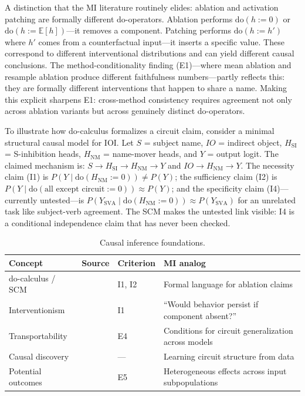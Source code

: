 \documentclass{article}
\begin{document}
A distinction that the MI literature routinely elides: ablation and activation patching are formally different do-operators. Ablation performs $\mathrm{do}(h := 0)$ or $\mathrm{do}(h := \mathbb{E}[h])$---it removes a component. Patching performs $\mathrm{do}(h := h')$ where $h'$ comes from a counterfactual input---it inserts a specific value. These correspond to different interventional distributions and can yield different causal conclusions. The method-conditionality finding (E1)---where mean ablation and resample ablation produce different faithfulness numbers---partly reflects this: they are formally different interventions that happen to share a name. Making this explicit sharpens E1: cross-method consistency requires agreement not only across ablation variants but across genuinely distinct do-operators.

To illustrate how do-calculus formalizes a circuit claim, consider a minimal structural causal model for IOI. Let $S$ = subject name, $IO$ = indirect object, $H_{\text{SI}}$ = S-inhibition heads, $H_{\text{NM}}$ = name-mover heads, and $Y$ = output logit. The claimed mechanism is: $S \to H_{\text{SI}} \to H_{\text{NM}} \to Y$ and $IO \to H_{\text{NM}} \to Y$. The necessity claim (I1) is $P(Y \mid \mathrm{do}(H_{\text{NM}} := 0)) \neq P(Y)$; the sufficiency claim (I2) is $P(Y \mid \mathrm{do}(\text{all except circuit} := 0)) \approx P(Y)$; and the specificity claim (I4)---currently untested---is $P(Y_{\text{SVA}} \mid \mathrm{do}(H_{\text{NM}} := 0)) \approx P(Y_{\text{SVA}})$ for an unrelated task like subject-verb agreement. The SCM makes the untested link visible: I4 is a conditional independence claim that has never been checked.

\begin{table}[H]
\centering\small
\caption{Causal inference foundations.}
\renewcommand{\arraystretch}{1.12}
\begin{tabular}{@{}l>{\raggedright\arraybackslash}p{2.5cm}l>{\raggedright\arraybackslash}p{4.2cm}@{}}
\toprule
\textbf{Concept} & \textbf{Source} & \textbf{Criterion} & \textbf{MI analog} \\
\midrule
do-calculus / SCM & \citet{pearl2009causality} & I1, I2 & Formal language for ablation claims \\
\midrule
Interventionism & \citet{woodward2003making} & I1 & ``Would behavior persist if component absent?'' \\
\midrule
Transportability & \citet{pearl2011transportability} & E4 & Conditions for circuit generalization across models \\
\midrule
Causal discovery & \citet{spirtes2000causation} & --- & Learning circuit structure from data \\
\midrule
Potential outcomes & \citet{rubin1974estimating} & E5 & Heterogeneous effects across input subpopulations \\
\bottomrule
\end{tabular}
\end{table}
\end{document}
